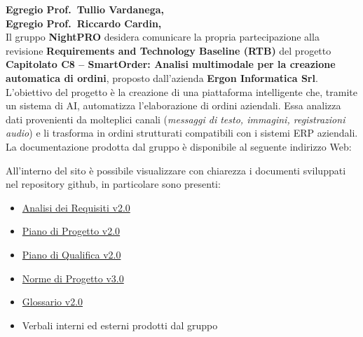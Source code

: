 \documentclass[a4paper, 11pt, oneside]{scrartcl} %
\begin{document}


\newpage

\noindent
\textbf{Egregio Prof.~Tullio Vardanega,}\\
\textbf{Egregio Prof.~Riccardo Cardin,}\\[0.6em]

\noindent
Il gruppo \textbf{NightPRO} desidera comunicare la propria partecipazione alla revisione \textbf{Requirements and Technology Baseline (RTB)} del progetto \textbf{Capitolato C8 – SmartOrder: Analisi multimodale per la creazione automatica di ordini}, proposto dall'azienda \textbf{Ergon Informatica Srl}.\\[0.6em]
\noindent
L'obiettivo del progetto è la creazione di una piattaforma intelligente che, tramite un sistema di AI, automatizza l'elaborazione di ordini aziendali. Essa analizza dati provenienti da molteplici canali (\textit{messaggi di testo, immagini, registrazioni audio}) e li trasforma in ordini strutturati compatibili con i sistemi ERP aziendali.\\[0.6em]

La documentazione prodotta dal gruppo è disponibile al seguente indirizzo Web:

\begin{center}

\end{center}

All'interno del sito è possibile visualizzare con chiarezza i documenti sviluppati nel repository github, in particolare sono presenti:
\begin{itemize}
    \item \href{https://swenightpro.github.io/Documentazione/docs/RTB/Documentazione\%20Esterna/Analisi_dei_Requisiti_v2.0.pdf}{Analisi dei Requisiti v2.0}
    \item \href{https://swenightpro.github.io/Documentazione/docs/RTB/Documentazione\%20Esterna/Piano_di_Progetto_v2.0.pdf}{Piano di Progetto v2.0}
    \item \href{https://swenightpro.github.io/Documentazione/docs/RTB/Documentazione\%20Esterna/Piano_di_Qualifica_v2.0.pdf}{Piano di Qualifica v2.0}
    \item \href{https://swenightpro.github.io/Documentazione/docs/RTB/Documentazione\%20Interna/Norme_di_Progetto_v3.0.pdf}{Norme di Progetto v3.0}
    \item \href{https://swenightpro.github.io/Documentazione/docs/RTB/Documentazione\%20Esterna/Glossario_v2.0.pdf}{Glossario v2.0}
    \item Verbali interni ed esterni prodotti dal gruppo
\end{itemize}
\end{document}
